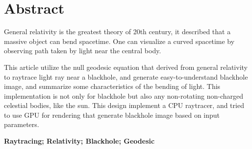 \vspace*{17mm}

{\let\clearpage\relax \chapter*{
  \textmd{Abstract}\vskip -3bp}}
\setcounter{page}{2}

\setlength{\parskip}{0em}

General relativity is the greatest theory of 20th century, it described that a massive object can bend spacetime. One can visualize a curved spacetime by observing path taken by light near the central body.

This article utilize the null geodesic equation that derived from general relativity to raytrace light ray near a blackhole, and generate easy-to-understand blackhole image, and summarize some characteristics of the bending of light. This implementation is not only for blackhole but also any non-rotating non-charged celestial bodies, like the sun. This design implement a CPU raytracer, and tried to use GPU for rendering that generate blackhole image based on input parameters.


\vspace{3ex}\noindent\textbf{Raytracing; Relativity; Blackhole; Geodesic}
\newpage
